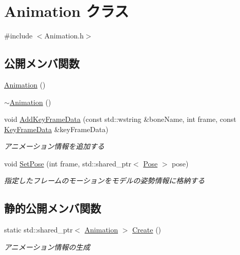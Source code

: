 \hypertarget{class_animation}{}\section{Animation クラス}
\label{class_animation}


{\ttfamily \#include $<$Animation.\+h$>$}

\subsection*{公開メンバ関数}
\begin{DoxyCompactItemize}
\item 
\mbox{\hyperlink{class_animation_a83f0a16cef7117f187ad596de38dd9d6}{Animation}} ()
\item 
\mbox{\hyperlink{class_animation_a401b68793d4fbf48d481c030ee4b2a16}{$\sim$\+Animation}} ()
\item 
void \mbox{\hyperlink{class_animation_a196d6edb1f31ae063d0163cab2c77171}{Add\+Key\+Frame\+Data}} (const std\+::wstring \&bone\+Name, int frame, const \mbox{\hyperlink{struct_key_frame_data}{Key\+Frame\+Data}} \&key\+Frame\+Data)
\begin{DoxyCompactList}\small\item\em アニメーション情報を追加する \end{DoxyCompactList}\item 
void \mbox{\hyperlink{class_animation_a8a47a880c08c3521751a9fd588a46fa5}{Set\+Pose}} (int frame, std\+::shared\+\_\+ptr$<$ \mbox{\hyperlink{class_pose}{Pose}} $>$ pose)
\begin{DoxyCompactList}\small\item\em 指定したフレームのモーションをモデルの姿勢情報に格納する \end{DoxyCompactList}\end{DoxyCompactItemize}
\subsection*{静的公開メンバ関数}
\begin{DoxyCompactItemize}
\item 
static std\+::shared\+\_\+ptr$<$ \mbox{\hyperlink{class_animation}{Animation}} $>$ \mbox{\hyperlink{class_animation_a31d99e6f260616ac6d18d0b8aa630248}{Create}} ()
\begin{DoxyCompactList}\small\item\em アニメーション情報の生成 \end{DoxyCompactList}\end{DoxyCompactItemize}


